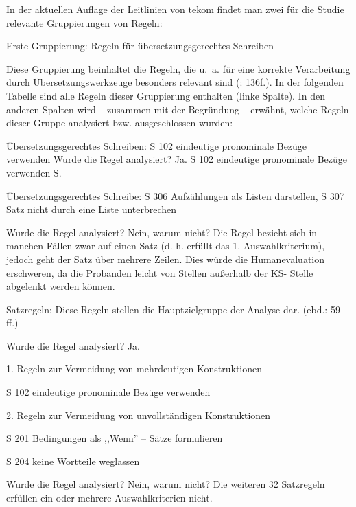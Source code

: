 \documentclass[output=paper]{langscibook}
\begin{document}
\noindent
[A] In der aktuellen Auflage der Leitlinien von tekom findet man zwei für die Studie relevante Gruppierungen von Regeln:

Erste Gruppierung: Regeln für übersetzungsgerechtes Schreiben

Diese Gruppierung beinhaltet die Regeln, die u.~a. für eine korrekte Verarbeitung durch Übersetzungswerkzeuge besonders relevant sind (\citealt{tekom2013}: 136f.). In der folgenden Tabelle sind alle Regeln dieser Gruppierung enthalten (linke Spalte). In den anderen Spalten wird – zusammen mit der Begründung – erwähnt, welche Regeln dieser Gruppe analysiert bzw. ausgeschlossen wurden:

Übersetzungsgerechtes Schreiben: S 102 eindeutige pronominale Bezüge verwenden
  Wurde die Regel analysiert? Ja. S 102 eindeutige pronominale Bezüge verwenden  S.

Übersetzungsgerechtes Schreibe: S 306 Aufzählungen als Listen darstellen, S 307 Satz nicht durch eine Liste unterbrechen

 Wurde die Regel analysiert? Nein, warum nicht? Die Regel bezieht sich in manchen Fällen zwar auf einen Satz (d. h. erfüllt das 1. Auswahlkriterium), jedoch geht der Satz über mehrere Zeilen. Dies würde die Humanevaluation erschweren, da die Probanden leicht von Stellen außerhalb der KS- Stelle abgelenkt werden können.
    
Satzregeln: Diese Regeln stellen die Hauptzielgruppe der Analyse dar. (ebd.: 59 ff.)

Wurde die Regel analysiert? Ja.

1. Regeln zur Vermeidung von mehrdeutigen Konstruktionen

S 102 eindeutige pronominale Bezüge verwenden

2. Regeln zur Vermeidung von unvollständigen Konstruktionen

S 201 Bedingungen als ,,Wenn'' – Sätze formulieren

S 204 keine Wortteile weglassen

Wurde die Regel analysiert? Nein, warum nicht? Die weiteren 32 Satzregeln erfüllen ein oder mehrere Auswahlkriterien nicht.
\end{document}
